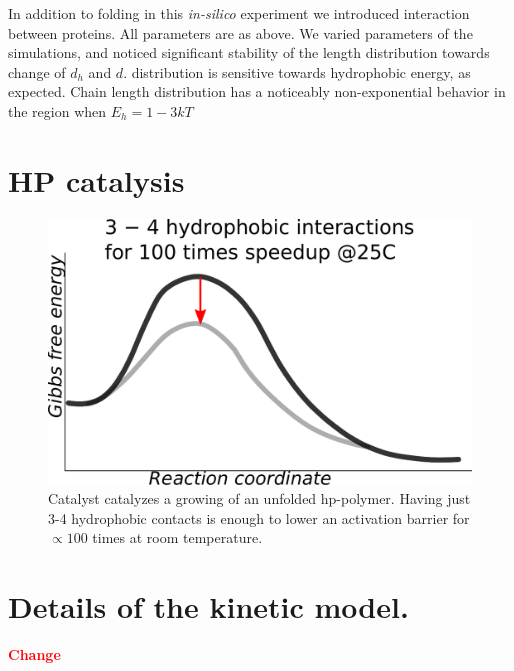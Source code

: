 \documentclass[journal=jacsat,manuscript=article,layout=twocolumn]{achemso}
\newcommand*{\red}[1]{\textcolor{red}{#1}}
\begin{document}
In addition to folding in this \textit{in-silico} experiment we introduced interaction between 
proteins. All parameters are as above. We varied parameters of the simulations, and noticed 
significant stability of the length distribution towards change of $d_h$ and $d$. distribution is 
sensitive towards hydrophobic energy, as expected. Chain length distribution has a noticeably 
non-exponential behavior in the region when $E_h= 1-3 kT$



 \newpage
\appendix
\section{HP catalysis}
\begin{figure}[h!]
  \centering
  \includegraphics[width=0.9\columnwidth]{pictures/hp-catalysis-b.pdf} 
  \caption{Catalyst catalyzes a growing of an unfolded hp-polymer. 
           Having just 3-4 hydrophobic contacts is enough to lower an 
           activation barrier for $\propto 100$ times at room 
           temperature.}
  \label{fig:hp-catalysis-b}
\end{figure}

\section{Details of the kinetic model.}
\red{\textbf{Change}}
\end{document}
